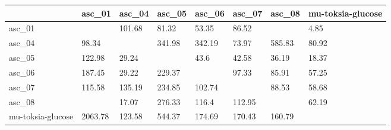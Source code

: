 \begin{tabular}{llllllll}
\toprule
{} &   asc\_01 &  asc\_04 &  asc\_05 &  asc\_06 &  asc\_07 &  asc\_08 & mu-toksia-glucose \\
\midrule
asc\_01            &          &  101.68 &   81.32 &   53.35 &   86.52 &         &              4.85 \\
asc\_04            &    98.34 &         &  341.98 &  342.19 &   73.97 &  585.83 &             80.92 \\
asc\_05            &   122.98 &   29.24 &         &    43.6 &   42.58 &   36.19 &             18.37 \\
asc\_06            &   187.45 &   29.22 &  229.37 &         &   97.33 &   85.91 &             57.25 \\
asc\_07            &   115.58 &  135.19 &  234.85 &  102.74 &         &   88.53 &             58.68 \\
asc\_08            &          &   17.07 &  276.33 &   116.4 &  112.95 &         &             62.19 \\
mu-toksia-glucose &  2063.78 &  123.58 &  544.37 &  174.69 &  170.43 &  160.79 &                   \\
\bottomrule
\end{tabular}
